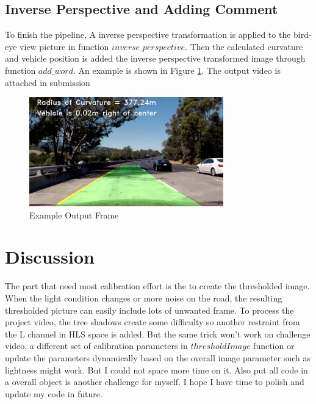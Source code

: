 \documentclass{article}
\begin{document}
\subsection{Inverse Perspective and Adding Comment} 
To finish the pipeline, A inverse perspective transformation is applied to the bird-eye view picture in function $inverse\_perspective$. Then the calculated curvature and vehicle position is added the inverse perspective transformed image through function $add\_word$. An example is shown in Figure \ref{fig8}. The output video is attached in submission

\begin{figure}[h!t]
\begin{center}
\includegraphics[width=0.75\textwidth]{../output_images/test/test5final.jpg}
\caption{Example Output Frame}
\label{fig8}
\end{center}
\end{figure}

\section{Discussion}
The part that need most calibration effort is the to create the thresholded image. When the light condition changes or more noise on the road, the resulting thresholded picture can easily include lots of unwanted frame.  To process the project video, the tree shadows create some difficulty so another restraint from the L channel in HLS space is added. But the same trick won't work on challenge video, a different set of calibration parameters in $thresholdImage$ function or update the parameters dynamically based on the overall image parameter such as lightness might work. But I could not spare more time on it. Also put all code in a overall object is another challenge for myself. I hope I have time to polish and update my code in future.
\end{document}
